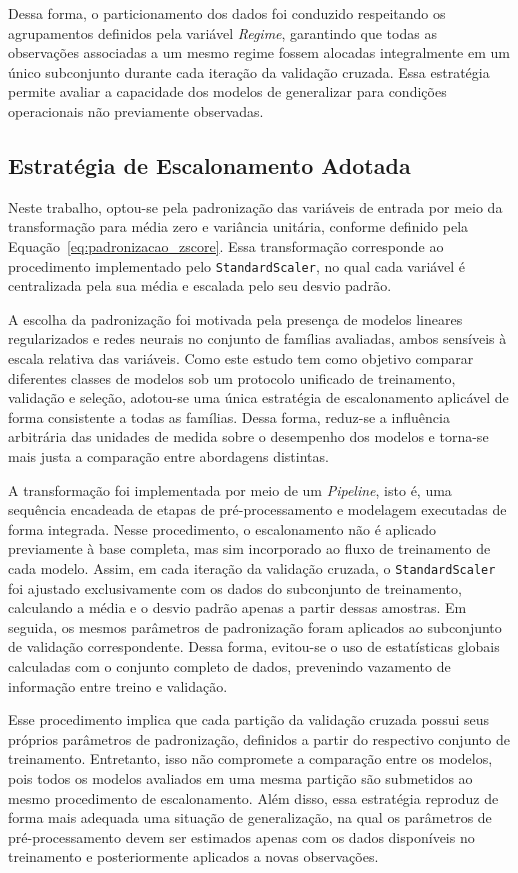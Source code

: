 Dessa forma, o particionamento dos dados foi conduzido respeitando os agrupamentos definidos pela variável \textit{Regime}, garantindo que todas as observações associadas a um mesmo regime fossem alocadas integralmente em um único subconjunto durante cada iteração da validação cruzada. Essa estratégia permite avaliar a capacidade dos modelos de generalizar para condições operacionais não previamente observadas.

\subsection{Estratégia de Escalonamento Adotada}

Neste trabalho, optou-se pela padronização das variáveis de entrada por meio da transformação para média zero e variância unitária, conforme definido pela Equação~\ref{eq:padronizacao_zscore}. Essa transformação corresponde ao procedimento implementado pelo \texttt{StandardScaler}, no qual cada variável é centralizada pela sua média e escalada pelo seu desvio padrão.

A escolha da padronização foi motivada pela presença de modelos lineares regularizados e redes neurais no conjunto de famílias avaliadas, ambos sensíveis à escala relativa das variáveis. Como este estudo tem como objetivo comparar diferentes classes de modelos sob um protocolo unificado de treinamento, validação e seleção, adotou-se uma única estratégia de escalonamento aplicável de forma consistente a todas as famílias. Dessa forma, reduz-se a influência arbitrária das unidades de medida sobre o desempenho dos modelos e torna-se mais justa a comparação entre abordagens distintas.


A transformação foi implementada por meio de um \textit{Pipeline}, isto é, uma sequência encadeada de etapas de pré-processamento e modelagem executadas de forma integrada. Nesse procedimento, o escalonamento não é aplicado previamente à base completa, mas sim incorporado ao fluxo de treinamento de cada modelo. Assim, em cada iteração da validação cruzada, o \texttt{StandardScaler} foi ajustado exclusivamente com os dados do subconjunto de treinamento, calculando a média e o desvio padrão apenas a partir dessas amostras. Em seguida, os mesmos parâmetros de padronização foram aplicados ao subconjunto de validação correspondente. Dessa forma, evitou-se o uso de estatísticas globais calculadas com o conjunto completo de dados, prevenindo vazamento de informação entre treino e validação.

Esse procedimento implica que cada partição da validação cruzada possui seus próprios parâmetros de padronização, definidos a partir do respectivo conjunto de treinamento. Entretanto, isso não compromete a comparação entre os modelos, pois todos os modelos avaliados em uma mesma partição são submetidos ao mesmo procedimento de escalonamento. Além disso, essa estratégia reproduz de forma mais adequada uma situação de generalização, na qual os parâmetros de pré-processamento devem ser estimados apenas com os dados disponíveis no treinamento e posteriormente aplicados a novas observações.

